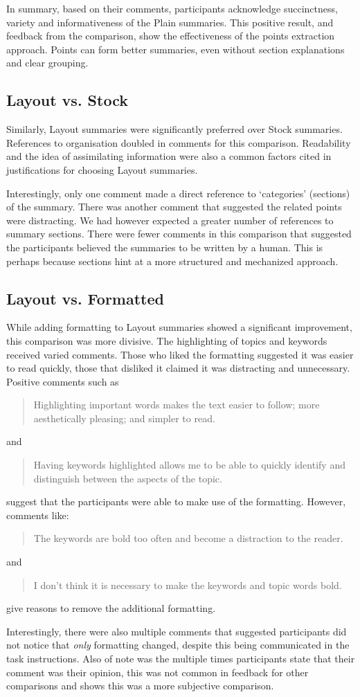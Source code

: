       In summary, based on their comments, participants acknowledge succinctness, variety and informativeness of the Plain summaries. This positive result, and feedback from the comparison, show the effectiveness of the points extraction approach. Points can form better summaries, even without section explanations and clear grouping.

    \tocless\subsection{Layout vs. Stock}
      Similarly, Layout summaries were significantly preferred over Stock summaries. References to organisation doubled in comments for this comparison. Readability and the idea of assimilating information were also a common factors cited in justifications for choosing Layout summaries.

      Interestingly, only one comment made a direct reference to `categories' (sections) of the summary. There was another comment that suggested the related points were distracting. We had however expected a greater number of references to summary sections. There were fewer comments in this comparison that suggested the participants believed the summaries to be written by a human. This is perhaps because sections hint at a more structured and mechanized approach.

    \tocless\subsection{Layout vs. Formatted}
      While adding formatting to Layout summaries showed a significant improvement, this comparison was more divisive. The highlighting of topics and keywords received varied comments. Those who liked the formatting suggested it was easier to read quickly, those that disliked it claimed it was distracting and unnecessary. Positive comments such as \blockquote{Highlighting important words makes the text easier to follow; more aesthetically pleasing; and simpler to read.} and \blockquote{Having keywords highlighted allows me to be able to quickly identify and distinguish between the aspects of the topic.} suggest that the participants were able to make use of the formatting. However, comments like: \blockquote{The keywords are bold too often and become a distraction to the reader.} and \blockquote{I don't think it is necessary to make the keywords and topic words bold.} give reasons to remove the additional formatting.

      Interestingly, there were also multiple comments that suggested participants did not notice that \textit{only} formatting changed, despite this being communicated in the task instructions. Also of note was the multiple times participants state that their comment was their opinion, this was not common in feedback for other comparisons and shows this was a more subjective comparison.

